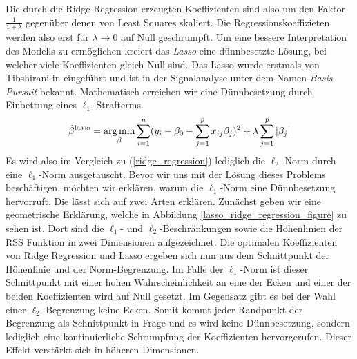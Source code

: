 Die durch die Ridge Regression erzeugten Koeffizienten sind also um den Faktor $\frac{1}{1+\lambda}$ gegenüber denen von Least Squares skaliert. Die Regressionskoeffizieten werden also erst für $\lambda \rightarrow 0$ auf Null geschrumpft. Um eine bessere Interpretation des Modells zu ermöglichen kreiert das \textit{Lasso} eine dünnbesetzte Lösung, bei welcher viele Koeffizienten gleich Null sind. Das Lasso wurde erstmals von Tibshirani in \cite{tibshirani_lasso} eingeführt und ist in der Signalanalyse unter dem Namen \textit{Basis Pursuit} \cite{chen} bekannt. Mathematisch erreichen wir eine Dünnbesetzung durch Einbettung eines $\ell_1$-Strafterms.
\begin{align}
\label{lasso_formulation}
\hat{\beta}^{\text{lasso}} = \operatorname*{arg\,min}_{\beta} \sum_{i=1}^{n}(y_i - \beta_0 - \sum_{j=1}^p x_{ij}\beta_j)^2 + \lambda\sum_{j=1}^p \left|\beta_j\right|
\end{align}
Es wird also im Vergleich zu (\ref{ridge_regression}) lediglich die $\ell_2$-Norm durch eine $\ell_1$-Norm ausgetauscht. Bevor wir uns mit der Lösung dieses Problems beschäftigen, möchten wir erklären, warum die $\ell_1$-Norm eine Dünnbesetzung hervorruft. Die lässt sich auf zwei Arten erklären. Zunächst geben wir eine geometrische Erklärung, welche in Abbildung \ref{lasso_ridge_regression_figure} zu sehen ist. Dort sind die $\ell_1$- und $\ell_2$-Beschränkungen sowie die Höhenlinien der RSS Funktion in zwei Dimensionen aufgezeichnet. Die optimalen Koeffizienten von Ridge Regression und Lasso ergeben sich nun aus dem Schnittpunkt der Höhenlinie und der Norm-Begrenzung. Im Falle der $\ell_1$-Norm ist dieser Schnittpunkt mit einer hohen Wahrscheinlichkeit an eine der Ecken und einer der beiden Koeffizienten wird auf Null gesetzt. Im Gegensatz gibt es bei der Wahl einer $\ell_2$-Begrenzung keine Ecken. Somit kommt jeder Randpunkt der Begrenzung als Schnittpunkt in Frage und es wird keine Dünnbesetzung, sondern lediglich eine kontinuierliche Schrumpfung der Koeffizienten hervorgerufen. Dieser Effekt verstärkt sich in höheren Dimensionen.

